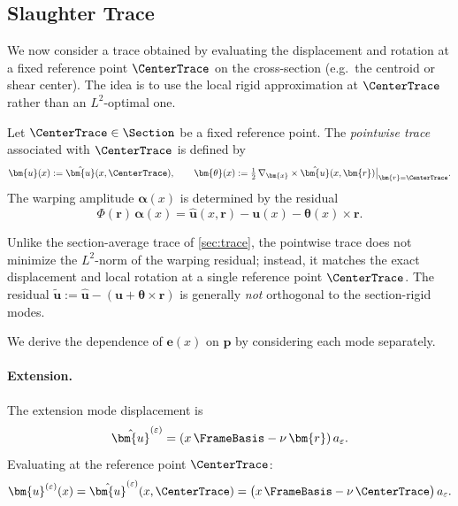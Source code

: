 \subsection{Slaughter Trace}\label{sec:trace-slaughter}

We now consider a trace obtained by evaluating the 
displacement and rotation at a fixed reference point $\CenterTrace$ on 
the cross-section (e.g.\ the centroid or shear center). The idea is to use the 
local rigid approximation at $\CenterTrace$ rather than an $L^2$-optimal 
one.

\begin{definition}
\label{def:pointwise-trace}
Let $\CenterTrace \in \Section$ be a fixed reference point. The 
\emph{pointwise trace} associated with $\CenterTrace$ is defined by
\begin{equation}
\label{eq:def-point-trace}
\bm{u}(x) := \hat{\bm{u}}(x,\CenterTrace),
\qquad
\bm{\theta}(x) := \tfrac{1}{2}\,\nabla_{\bm{x}} \times 
\hat{\bm{u}}(x,\bm{r})\big|_{\bm{r}=\CenterTrace}.
\end{equation}
The warping amplitude $\bm{\alpha}(x)$ is determined by the residual
\begin{equation}
\Phi(\bm{r})\,\bm{\alpha}(x)
=
\hat{\bm{u}}(x,\bm{r}) - \bm{u}(x) - \bm{\theta}(x)\times\bm{r}.
\end{equation}
\end{definition}

\begin{remark}
Unlike the section-average trace of \cref{sec:trace}, the pointwise trace does 
not minimize the $L^2$-norm of the warping residual; instead, it matches the 
exact displacement and local rotation at a single reference point 
$\CenterTrace$. The residual 
$\tilde{\bm{u}} := \hat{\bm{u}} - (\bm{u} + \bm{\theta}\times\bm{r})$ 
is generally \emph{not} orthogonal to the section-rigid modes.
\end{remark}

We derive the dependence of $\bm{e}(x)$ on $\bm{p}$ by 
considering each mode separately.

\paragraph{Extension.}

The extension mode displacement is
\begin{equation*}
\hat{\bm{u}}^{(\varepsilon)} = (x\,\FrameBasis - \nu\,\bm{r})\,a_\varepsilon.
\end{equation*}
Evaluating at the reference point $\CenterTrace$:
\begin{equation*}
\bm{u}^{(\varepsilon)}(x)
=
\hat{\bm{u}}^{(\varepsilon)}(x,\CenterTrace)
=
\big(x\,\FrameBasis - \nu\,\CenterTrace\big)\,a_\varepsilon.
\end{equation*}

